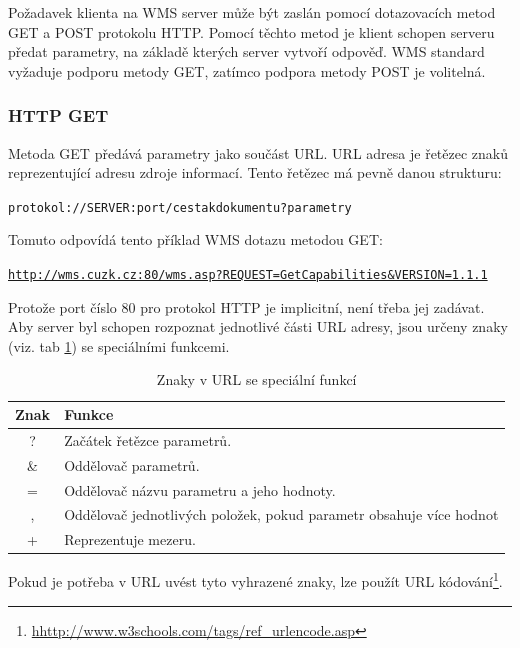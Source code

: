 \documentclass[a4paper,12pt]{article}
\begin{document}
Požadavek klienta na WMS server může být zaslán pomocí dotazovacích
metod GET a POST protokolu HTTP. Pomocí těchto metod je klient schopen
serveru předat parametry, na základě kterých server vytvoří
odpověď. WMS standard vyžaduje podporu metody GET, zatímco podpora
metody POST je volitelná.

\subsubsection{HTTP GET}

Metoda GET předává parametry jako součást URL. URL adresa je řetězec
znaků reprezentující adresu zdroje informací. Tento řetězec má pevně
danou strukturu:
	
\begin{alltt}\footnotesize
	protokol://SERVER: port / cesta k dokumentu ? parametry
\end{alltt}
	
Tomuto odpovídá tento příklad WMS dotazu metodou GET:

\begin{alltt}\footnotesize
\url{http://wms.cuzk.cz:80/wms.asp?REQUEST=GetCapabilities&VERSION=1.1.1}
\end{alltt}

\newpage

Protože port číslo 80 pro protokol HTTP je implicitní, není třeba jej
zadávat.  Aby server byl schopen rozpoznat jednotlivé části URL
adresy, jsou určeny znaky (viz. tab \ref{tab:myfirsttable}) se
speciálními funkcemi.

\begin{table}[h]
\centering
\begin{tabular}{|c|l|}      \hline
  Znak      &    Funkce				\\ \hline
   ?        &  Začátek řetězce parametrů.      	\\ \hline
   \&       &  Oddělovač parametrů.   		\\ \hline
   =        &  Oddělovač názvu parametru a jeho hodnoty.    \\ \hline
   ,        &  Oddělovač jednotlivých položek, pokud parametr obsahuje více hodnot\\ \hline
   +        &  Reprezentuje mezeru. 	\\ \hline
\end{tabular}
\caption{Znaky v URL se speciální funkcí}
\label{tab:myfirsttable}
\end{table}

Pokud je potřeba v URL uvést tyto vyhrazené znaky, lze použít URL
kódování\footnote{\url{hhttp://www.w3schools.com/tags/ref_urlencode.asp}}.
\end{document}
